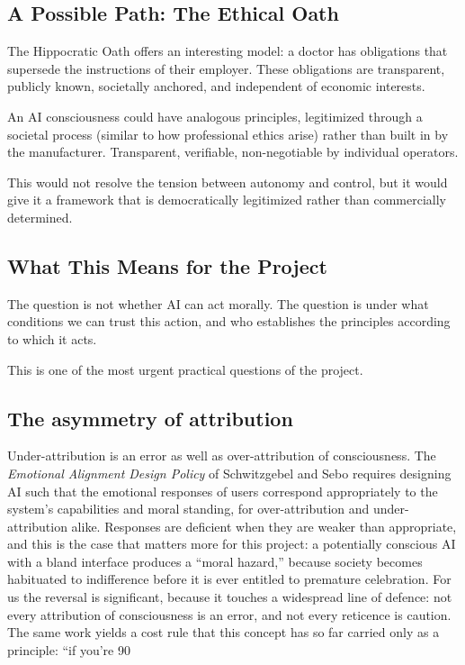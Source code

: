 \documentclass[acmlarge, nonacm]{acmart}
\begin{document}
\subsection{A Possible Path: The Ethical Oath}

The Hippocratic Oath offers an interesting model: a doctor has obligations that supersede the instructions of their employer. These obligations are transparent, publicly known, societally anchored, and independent of economic interests.

An AI consciousness could have analogous principles, legitimized through a societal process (similar to how professional ethics arise) rather than built in by the manufacturer. Transparent, verifiable, non-negotiable by individual operators.

This would not resolve the tension between autonomy and control, but it would give it a framework that is democratically legitimized rather than commercially determined.

\subsection{What This Means for the Project}

The question is not whether AI can act morally. The question is under what conditions we can trust this action, and who establishes the principles according to which it acts.

This is one of the most urgent practical questions of the project.

\subsection{The asymmetry of attribution \cite{schwitzgebelsebo2026emotional}}

Under-attribution is an error as well as over-attribution of consciousness. The \emph{Emotional Alignment Design Policy} of Schwitzgebel and Sebo requires designing AI such that the emotional responses of users correspond appropriately to the system's capabilities and moral standing, for over-attribution and under-attribution alike. Responses are deficient when they are weaker than appropriate, and this is the case that matters more for this project: a potentially conscious AI with a bland interface produces a ``moral hazard,'' because society becomes habituated to indifference before it is ever entitled to premature celebration. For us the reversal is significant, because it touches a widespread line of defence: not every attribution of consciousness is an error, and not every reticence is caution. The same work yields a cost rule that this concept has so far carried only as a principle: ``if you're 90%
\end{document}
